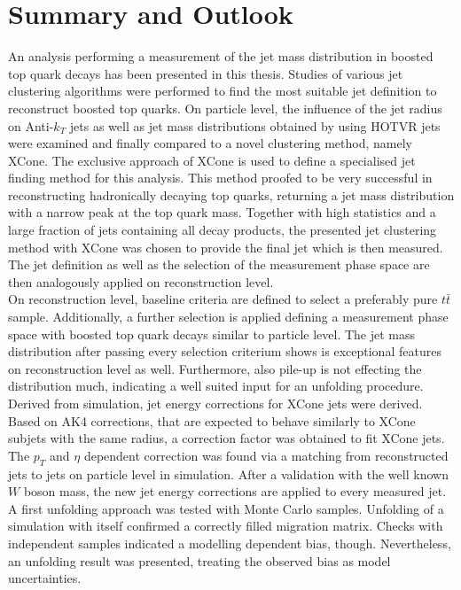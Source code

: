 \chapter{Summary and Outlook}
	An analysis performing a measurement of the jet mass distribution in boosted top quark decays has been presented in this thesis. Studies of various jet clustering algorithms were performed to find the most suitable jet definition to reconstruct boosted top quarks. On particle level, the influence of the jet radius on Anti-$k_T$ jets as well as jet mass distributions obtained by using HOTVR jets were examined and finally compared to a novel clustering method, namely XCone. The exclusive approach of XCone is used to define a specialised jet finding method for this analysis. This method proofed to be very successful in reconstructing hadronically decaying top quarks, returning a jet mass distribution with a narrow peak at the top quark mass. Together with high statistics and a large fraction of jets containing all decay products, the presented jet clustering method with XCone was chosen to provide the final jet which is then measured. The jet definition as well as the selection of the measurement phase space are then analogously applied on reconstruction level. \\
	On reconstruction level, baseline criteria are defined to select a preferably pure $t\bar{t}$ sample. Additionally, a further selection is applied defining a measurement phase space with boosted top quark decays similar to particle level. The jet mass distribution after passing every selection criterium shows is exceptional features on reconstruction level as well. Furthermore, also pile-up is not effecting the distribution much, indicating a well suited input for an unfolding procedure. Derived from simulation, jet energy corrections for XCone jets were derived. Based on AK4 corrections, that are expected to behave similarly to XCone subjets with the same radius, a correction factor was obtained to fit XCone jets. The $p_T$ and $\eta$ dependent correction was found via a matching from reconstructed jets to jets on particle level in simulation. After a validation with the well known $W$ boson mass, the new jet energy corrections are applied to every measured jet.\\	
	A first unfolding approach was tested with Monte Carlo samples. Unfolding of a simulation with itself confirmed a correctly filled migration matrix. Checks with independent samples indicated a modelling dependent bias, though. Nevertheless, an unfolding result was presented, treating the observed bias as model uncertainties. \\
